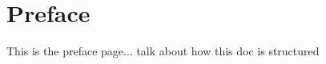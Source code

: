 \cleardoublepage
\chapter*{Preface}
\begin{fullwidth}

This is the preface page... talk about how this doc is structured

\end{fullwidth}